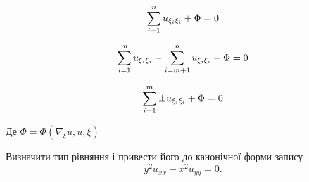 \begin{th_equation}
	\begin{equation}
		\displaystyle\sum\limits_{i=1}^n u_{\xi_i\xi_i} + \Phi = 0
	\end{equation}
\end{th_equation}

\begin{th_equation}
	\begin{equation}
		\displaystyle\sum\limits_{i=1}^m u_{\xi_i\xi_i} - \displaystyle\sum\limits_{i=m+1}^n u_{\xi_i\xi_i} + \Phi = 0
	\end{equation}
\end{th_equation}

\begin{th_equation}
	\begin{equation}
		\displaystyle\sum\limits_{i=1}^m \pm u_{\xi_i\xi_i} + \Phi = 0
	\end{equation}
\end{th_equation}

\newpage
Де $\Phi=\Phi(\nabla_\xi u, u,\xi) $

\begin{example}
	Визначити тип рівняння і привести його до канонічної форми запису
	\begin{equation*}
		y^2 u_{xx} - x^2 u_{yy} = 0.
	\end{equation*}
\end{example}

